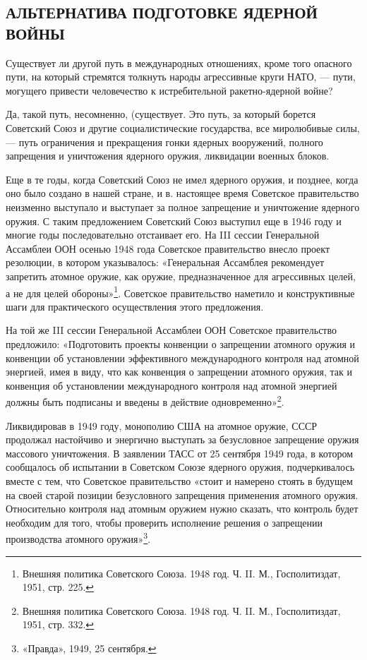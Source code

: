 \documentclass[12pt, a4paper, openany]{book}
\begin{document}
	\subsection[Альтернатива подготовке ядерной войны]{\center АЛЬТЕРНАТИВА ПОДГОТОВКЕ ЯДЕРНОЙ ВОЙНЫ}	
		
	Существует ли другой путь в международных отношениях, кроме того опасного пути, на который стремятся толкнуть народы агрессивные круги НАТО, — пути, могущего привести человечество к истребительной ракетно-ядерной войне?
	
	Да, такой путь, несомненно, (существует. Это путь, за который борется Советский Союз и другие социалистические государства, все миролюбивые силы, — путь ограничения и прекращения гонки ядерных вооружений, полного запрещения и уничтожения ядерного оружия, ликвидации военных блоков.
	
	Еще в те годы, когда Советский Союз не имел ядерного оружия, и позднее, когда оно было создано в нашей стране, и в. настоящее время Советское правительство неизменно выступало и выступает за полное запрещение и уничтожение ядерного оружия. С таким предложением Советский Союз выступил еще в 1946 году и многие годы последовательно отстаивает его. На III сессии Генеральной Ассамблеи ООН осенью 1948 года Советское правительство внесло проект резолюции, в котором указывалось: «Генеральная Ассамблея рекомендует запретить атомное оружие, как оружие, предназначенное для агрессивных целей, а не для целей обороны»{\footnote{Внешняя политика Советского Союза. 1948 год. Ч. II. М., Госполитиздат, 1951, стр. 225.}}. Советское правительство наметило и конструктивные шаги для практического осуществления этого предложения.
	
	На той же III сессии Генеральной Ассамблеи ООН Советское правительство предложило: «Подготовить проекты конвенции о запрещении атомного оружия и конвенции об установлении эффективного международного контроля над атомной энергией, имея в виду, что как конвенция о запрещении атомного оружия, так и конвенция об установлении международного контроля над атомной энергией должны быть подписаны и введены в действие одновременно»{\footnote{Внешняя политика Советского Союза. 1948 год. Ч. II. М., Госполитиздат, 1951, стр. 332.}}.
	
	Ликвидировав в 1949 году, монополию США на атомное оружие, СССР продолжал настойчиво и энергично выступать за безусловное запрещение оружия массового уничтожения. В заявлении ТАСС от 25 сентября 1949 года, в котором сообщалось об испытании в Советском Союзе ядерного оружия, подчеркивалось вместе с тем, что Советское правительство «стоит и намерено стоять в будущем на своей старой позиции безусловного запрещения применения атомного оружия.
	Относительно контроля над атомным оружием нужно сказать, что контроль будет необходим для того, чтобы проверить исполнение решения о запрещении производства атомного оружия»{\footnote{«Правда», 1949, 25 сентября.}}.
	
\end{document}
